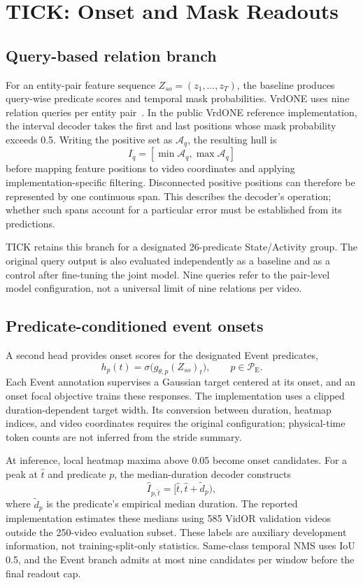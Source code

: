 \documentclass[10pt,twocolumn,letterpaper]{article}
\newcommand{\method}{TICK\xspace}
\newcommand{\event}{\mathcal{P}_{\mathrm{E}}}
\begin{document}
\section{TICK: Onset and Mask Readouts}
\subsection{Query-based relation branch}
For an entity-pair feature sequence $Z_{so}=(z_1,\ldots,z_T)$, the baseline produces query-wise predicate scores and temporal mask probabilities. VrdONE uses nine relation queries per entity pair~\cite{jiang2024vrdone}. In the public VrdONE reference implementation, the interval decoder takes the first and last positions whose mask probability exceeds 0.5. Writing the positive set as $\mathcal{A}_q$, the resulting hull is
\begin{equation}
 I_q=[\min\mathcal{A}_q,\max\mathcal{A}_q]
\end{equation}
before mapping feature positions to video coordinates and applying implementation-specific filtering. Disconnected positive positions can therefore be represented by one continuous span. This describes the decoder's operation; whether such spans account for a particular error must be established from its predictions.

\method retains this branch for a designated 26-predicate State/Activity group. The original query output is also evaluated independently as a baseline and as a control after fine-tuning the joint model. Nine queries refer to the pair-level model configuration, not a universal limit of nine relations per video.

\subsection{Predicate-conditioned event onsets}
A second head provides onset scores for the designated Event predicates,
\begin{equation}
 h_p(t)=\sigma\big(g_{\theta,p}(Z_{so})_t\big),
 \qquad p\in\event.
\end{equation}
Each Event annotation supervises a Gaussian target centered at its onset, and an onset focal objective trains these responses. The implementation uses a clipped duration-dependent target width. Its conversion between duration, heatmap indices, and video coordinates requires the original configuration; physical-time token counts are not inferred from the stride summary.

At inference, local heatmap maxima above 0.05 become onset candidates. For a peak at $\hat t$ and predicate $p$, the median-duration decoder constructs
\begin{equation}
 \hat I_{p,\hat t}=[\hat t,\hat t+\widetilde d_p),
 \label{eq:peak}
\end{equation}
where $\widetilde d_p$ is the predicate's empirical median duration. The reported implementation estimates these medians using 585 VidOR validation videos outside the 250-video evaluation subset. These labels are auxiliary development information, not training-split-only statistics. Same-class temporal NMS uses IoU 0.5, and the Event branch admits at most nine candidates per window before the final readout cap.
\end{document}
